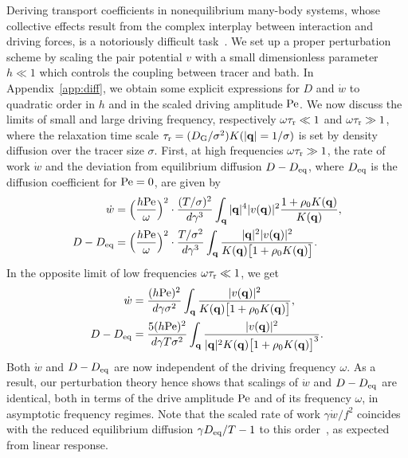 \documentclass[superscriptaddress, twocolumn, prx, longbibliography, nofootinbib]{revtex4-1}
\begin{document}
Deriving transport coefficients in nonequilibrium many-body systems, whose collective effects result from the complex interplay between interaction and driving forces, is a notoriously difficult task~\cite{Voituriez2016, Brady2017, Stenhammar2017, Tailleur2017, Illien2018}. We set up a proper perturbation scheme by scaling the pair potential $v$ with a small dimensionless parameter $h\ll1$ which controls the coupling between tracer and bath. In Appendix~\ref{app:diff}, we obtain some explicit expressions for $D$ and $\dot w$ to quadratic order in $h$ and in the scaled driving amplitude $\rm Pe$. We now discuss the limits of small and large driving frequency, respectively $\omega\tau_{\rm r}\ll 1$ and $\omega\tau_{\rm r}\gg 1$, where the relaxation time scale $\tau_{\rm r}=(D_{\rm G}/\sigma^2)K(|{\bf q}|=1/\sigma)$ is set by density diffusion over the tracer size $\sigma$. First, at high frequencies $\omega\tau_{\rm r}\gg 1$, the rate of work $\dot w$ and the deviation from equilibrium diffusion $D-D_{\rm eq}$, where $D_{\rm eq}$ is the diffusion coefficient for ${\rm Pe}=0$, are given by
\begin{equation}\label{eq:small}
	\begin{aligned}
		\dot w &= \Big(\frac{h{\rm Pe}}{\omega}\Big)^2 \cdot \frac{(T/\sigma)^2}{d\gamma^3} \int_{\bf q} |{\bf q}|^4 |v({\bf q})|^2 \frac{1 + \rho_0K({\bf q})}{K({\bf q})} ,
		\\
		D-D_{\rm eq} &= \Big(\frac{h{\rm Pe}}{\omega}\Big)^2 \cdot \frac{T /\sigma^2}{d\gamma^3} \int_{\bf q}\frac{|{\bf q}|^2 |v({\bf q})|^2 } {K({\bf q})\big[1 + \rho_0 K({\bf q})\big]} .
	\end{aligned}
\end{equation}
In the opposite limit of low frequencies $\omega\tau_{\rm r}\ll 1$, we get
\begin{equation}\label{eq:large}
	\begin{aligned}
		\dot w &=  \frac{(h{\rm Pe})^2}{d\gamma\sigma^2} \int_{\bf q} \frac{|v({\bf q})|^2}{K({\bf q})\big[1 + \rho_0K({\bf q})\big]} ,
		\\
		D - D_{\rm eq} &= \frac{5(h{\rm Pe})^2}{d\gamma T\sigma^2} \int_{\bf q} \frac{|v({\bf q})|^2}{|{\bf q}|^2K({\bf q})\big[1 + \rho_0K({\bf q})\big]^3} .
	\end{aligned}
\end{equation}
Both $\dot w$ and $D-D_{\rm eq}$ are now independent of the driving frequency $\omega$. As a result, our perturbation theory hence shows that scalings of $\dot w$ and $D-D_{\rm eq}$ are identical, both in terms of the drive amplitude $\rm Pe$ and of its frequency $\omega$, in asymptotic frequency regimes. Note that the scaled rate of work $\gamma\dot w/f^2$ coincides with the reduced equilibrium diffusion $\gamma D_{\rm eq}/T-1$ to this order~\cite{Demery2011, Demery2014}, as expected from linear response.
\end{document}
